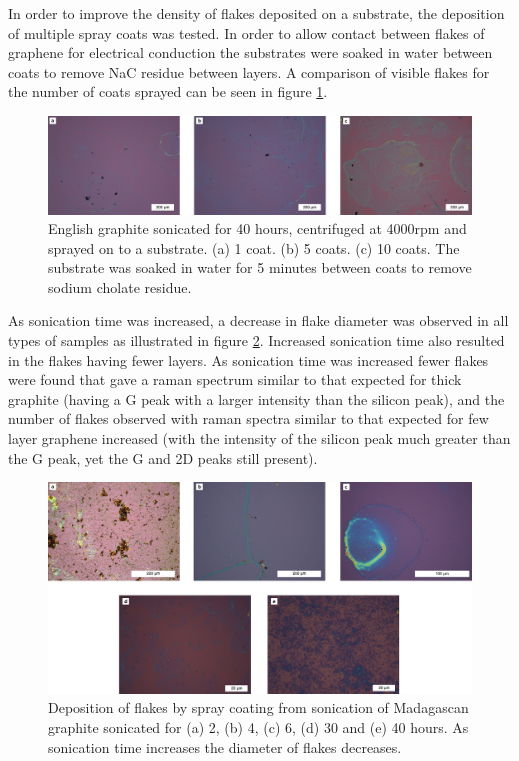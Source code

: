 \documentclass[12pt,titlepage]{article}
\begin{document}
	In order to improve the density of flakes deposited on a substrate, the deposition of multiple spray coats was tested. In order to allow contact between flakes of graphene for electrical conduction the substrates were soaked in water between coats to remove NaC residue between layers. A comparison of visible flakes for the number of coats sprayed can be seen in figure \ref{fig:coats}.
	
	\begin{figure}
		\centering
		\includegraphics[width=1\textwidth]{figures/coats.png}
		\caption[Comparison of flake density for number of spray coats.]{English graphite sonicated for 40 hours, centrifuged at 4000rpm and sprayed on to a substrate. (a) 1 coat. (b) 5 coats. (c) 10 coats. The substrate was soaked in water for 5 minutes between coats to remove sodium cholate residue.}
		\label{fig:coats}
	\end{figure}
	
	As sonication time was increased, a decrease in flake diameter was observed in all types of samples as illustrated in figure \ref{fig:sonication-size}. Increased sonication time also resulted in the flakes having fewer layers. As sonication time was increased fewer flakes were found that gave a raman spectrum similar to that expected for thick graphite (having a G peak with a larger intensity than the silicon peak), and the number of flakes observed with raman spectra similar to that expected for few layer graphene increased (with the intensity of the silicon peak much greater than the G peak, yet the G and 2D peaks still present).

	\begin{figure}
		\centering
		\includegraphics[width=1\textwidth]{figures/sonication.png}
		\caption[Comparison of sonication times on flake diameter.]{Deposition of flakes by spray coating from sonication of Madagascan graphite sonicated for (a) 2, (b) 4, (c) 6, (d) 30 and (e) 40 hours. As sonication time increases the diameter of flakes decreases.}
		\label{fig:sonication-size}
	\end{figure}
\end{document}
